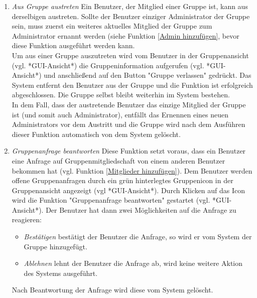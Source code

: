 \documentclass[parskip=full]{scrartcl}
\def\threedigits#1{%
  \ifnum#1<100 0\fi
  \ifnum#1<10 0\fi
  \number#1}
\begin{document}
\begin{enumerate}[label={\textbf{/F\protect\threedigits{\theenumi}0/}}, leftmargin=*, resume]
	\item \textit{Aus Gruppe austreten}
	Ein \gls{Benutzer}, der Mitglied einer Gruppe ist, kann aus derselbigen austreten. Sollte der Benutzer einziger Administrator der Gruppe sein, muss zuerst ein weiteres aktuelles Mitglied der Gruppe zum Administrator ernannt werden (siehe Funktion \ref{Admin hinzufügen}, bevor diese Funktion ausgeführt werden kann. \\
	Um aus einer Gruppe auszutreten wird vom Benutzer in der Gruppenansicht (vgl. *GUI-Ansicht*) die Gruppeninformation aufgerufen (vgl. *GUI-Ansicht*) und anschließend auf den Button "Gruppe verlassen" gedrückt. Das System entfernt den Benutzer aus der Gruppe und die Funktion ist erfolgreich abgeschlossen. Die Gruppe selbst bleibt weiterhin im System bestehen.\\
	In dem Fall, dass der austretende Benutzer das einzige Mitglied der Gruppe ist (und somit auch Administrator), entfällt das Ernennen eines neuen Administrators vor dem Austritt und die Gruppe wird nach dem Ausführen dieser Funktion automatisch von dem System gelöscht.
	
	\item \textit{Gruppenanfrage beantworten} \label{Gruppenanfrage beantworten}
	Diese Funktion setzt voraus, dass ein Benutzer eine Anfrage auf Gruppenmitgliedschaft von einem anderen Benutzer bekommen hat (vgl. Funktion \ref{Mitglieder hinzufügen}). Dem Benutzer werden offene Gruppenanfragen durch ein grün hinterlegtes Gruppenicon in der Gruppenansicht angezeigt (vgl *GUI-Ansicht*). Durch Klicken auf das Icon wird die Funktion "Gruppenanfrage beantworten" gestartet (vgl. *GUI-Ansicht*). Der Benutzer hat dann zwei Möglichkeiten auf die Anfrage zu reagieren:
	\begin{itemize}
		\item \textit{Bestätigen} bestätigt der Benutzer die Anfrage, so wird er vom System der Gruppe hinzugefügt.
		\item \textit{Ablehnen} lehnt der Benutzer die Anfrage ab, wird keine weitere Aktion des Systems ausgeführt.
	\end{itemize}
Nach Beantwortung der Anfrage wird diese vom System gelöscht.
\end{enumerate}
\end{document}
